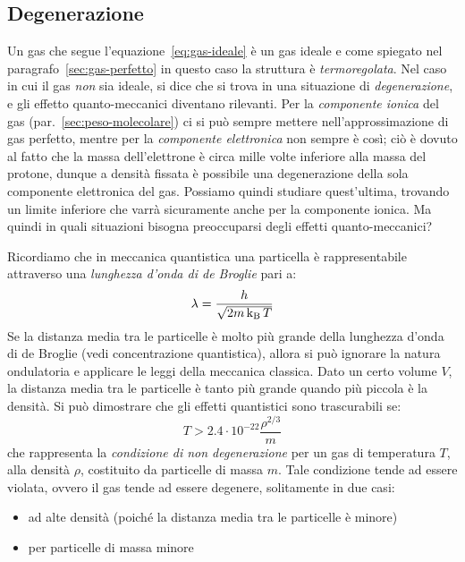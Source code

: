 \subsection{Degenerazione}\label{sec:degenerazione}
Un gas che segue l'equazione~\eqref{eq:gas-ideale} è un gas ideale e come spiegato nel paragrafo~\ref{sec:gas-perfetto} in questo caso la struttura è \emph{termoregolata}. Nel caso in cui il gas \emph{non} sia ideale, si dice che si trova in una situazione di \emph{degenerazione}, e gli effetto quanto-meccanici diventano rilevanti. Per la \emph{componente ionica} del gas (par.~\ref{sec:peso-molecolare}) ci si può sempre mettere nell'approssimazione di gas perfetto, mentre per la \emph{componente elettronica} non sempre è così; ciò è dovuto al fatto che la massa dell'elettrone è circa mille volte inferiore alla massa del protone, dunque a densità fissata è possibile una degenerazione della sola componente elettronica del gas. Possiamo quindi studiare quest'ultima, trovando un limite inferiore che varrà sicuramente anche per la componente ionica. Ma quindi in quali situazioni bisogna preoccuparsi degli effetti quanto-meccanici?

Ricordiamo che in meccanica quantistica una particella è rappresentabile attraverso una \emph{lunghezza d'onda di de Broglie} pari a:
\begin{equation}\label{eq:lunghezza-de-broglie}
    \lambda = \dfrac{h}{\sqrt{2 m \operatorname{k_B} T}}
\end{equation}
Se la distanza media tra le particelle è molto più grande della lunghezza d'onda di de Broglie (vedi concentrazione quantistica), allora si può ignorare la natura ondulatoria e applicare le leggi della meccanica classica. Dato un certo volume $V$, la distanza media tra le particelle è tanto più grande quando più piccola è la densità. Si può dimostrare che gli effetti quantistici sono trascurabili se:
\[
T > 2.4\cdot 10^{-22} \frac{\rho^{2/3}}{m}
\]
che rappresenta la \emph{condizione di non degenerazione} per un gas di temperatura $T$, alla densità $\rho$, costituito da particelle di massa $m$. Tale condizione tende ad essere violata, ovvero il gas tende ad essere degenere, solitamente in due casi:
\begin{itemize}
    \item ad alte densità (poiché la distanza media tra le particelle è minore)
    \item  per particelle di massa minore
\end{itemize}

